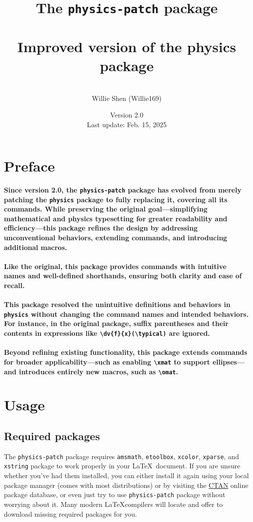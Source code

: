 \documentclass[a4paper,12pt]{article}
\title{The \texttt{physics-patch} package\\\mbox{}\\\textnormal{\large Improved version of the physics package}}
\author{\mbox{}\\Willie Shen (Willie169)}
\date{Version 2.0\\\textnormal{Last update: Feb. 15, 2025}}
\newcommand{\cbox}[2][cyan]{\mathchoice{\setlength{\fboxsep}{0pt}\colorbox{#1}{$\displaystyle#2$}}{\setlength{\fboxsep}{0pt}\colorbox{#1}{$\textstyle#2$}}{\setlength{\fboxsep}{0pt}\colorbox{#1}{$\scriptstyle#2$}}{\setlength{\fboxsep}{0pt}\colorbox{#1}{$\scriptscriptstyle#2$}}}
\newcommand{\typical}{\cbox{\phantom{A}}}
\renewcommand{\maketitle}{
\begin{titlepage}
\begin{center}
\vspace*{\fill}
{\huge \bfseries \thetitle\par}
\vskip 1.5em
{\Large \theauthor\par}
\vskip 1em
{\large \thedate\par}
\vspace*{\fill}
\end{center}
\end{titlepage}
}
\begin{document}
\onehalfspacing\thispagestyle{empty}\Needspace{1\textheight}\maketitle\setcounter{page}{1}\Needspace{1\textheight}\tableofcontents\Needspace{1\textheight}\setcounter{page}{1}
\section{Preface}
\paragraph*{Since version 2.0, the \texttt{physics-patch} package has evolved from merely patching the \texttt{physics} package to fully replacing it, covering all its commands. While preserving the original goal—simplifying mathematical and physics typesetting for greater readability and efficiency—this package refines the design by addressing unconventional behaviors, extending commands, and introducing additional macros.}
\paragraph*{Like the original, this package provides commands with intuitive names and well-defined shorthands, ensuring both clarity and ease of recall.}
\paragraph*{This package resolved the unintuitive definitions and behaviors in \texttt{physics} without changing the command names and intended behaviors. For instance, in the original package, suffix parentheses and their contents in expressions like \verb|\dv{f}{x}(\typical)| are ignored.}
\paragraph*{Beyond refining existing functionality, this package extends commands for broader applicability—such as enabling \verb|\xmat| to support ellipses—and introduces entirely new macros, such as \verb|\omat|.}
\section{Usage}
\subsection{Required packages}
The \texttt{physics-patch} package requires \texttt{amsmath}, \texttt{etoolbox}, \texttt{xcolor}, \texttt{xparse}, and \texttt{xstring} package to work properly in your \LaTeX~document. If you are unsure whether you've had them installed, you can either install it again using your local package manager (comes with most distributions) or by visiting the \href{http://www.ctan.org}{CTAN} online package database, or even just try to use \texttt{physics-patch} package without worrying about it. Many modern \LaTeX compilers will locate and offer to download missing required packages for you.
\end{document}
